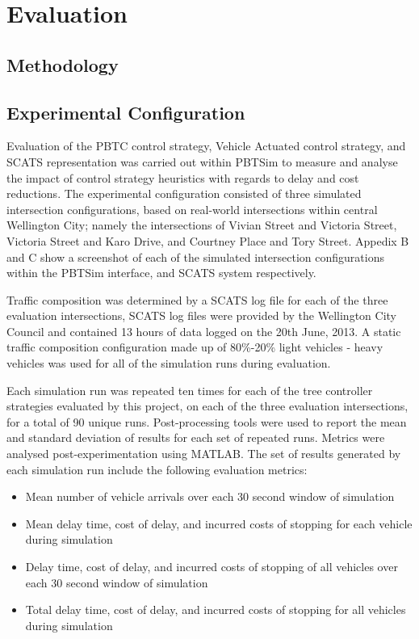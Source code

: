 \chapter{Evaluation}

\section{Methodology}

\section{Experimental Configuration}

Evaluation of the PBTC control strategy, Vehicle Actuated control strategy, and SCATS representation was carried out within PBTSim to measure and analyse the impact of control strategy heuristics with regards to delay and cost reductions. The experimental configuration consisted of three simulated intersection configurations, based on real-world intersections within central Wellington City; namely the intersections of Vivian Street and Victoria Street, Victoria Street and Karo Drive, and Courtney Place and Tory Street. Appedix B and C show a screenshot of each of the simulated intersection configurations within the PBTSim interface, and SCATS system respectively.

Traffic composition was determined by a SCATS log file for each of the three evaluation intersections, SCATS log files were provided by the Wellington City Council and contained 13 hours of data logged on the 20th June, 2013. A static traffic composition configuration made up of 80\%-20\% light vehicles - heavy vehicles was used for all of the simulation runs during evaluation.

Each simulation run was repeated ten times for each of the tree controller strategies evaluated by this project, on each of the three evaluation intersections, for a total of 90 unique runs. Post-processing tools were used to report the mean and standard deviation of results for each set of repeated runs. Metrics were analysed post-experimentation using MATLAB. The set of results generated by each simulation run include the following evaluation metrics:

\begin{itemize}
\item Mean number of vehicle arrivals over each 30 second window of simulation
\item Mean delay time, cost of delay, and incurred costs of stopping for each vehicle during simulation
\item Delay time, cost of delay, and incurred costs of stopping of all vehicles over each 30 second window of simulation
\item Total delay time, cost of delay, and incurred costs of stopping for all vehicles during simulation
\end{itemize}

